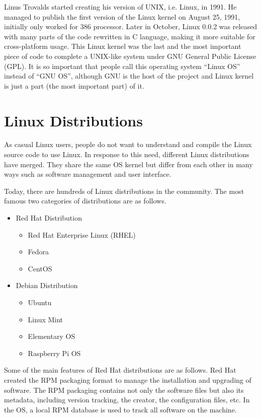 Linus Trovalds started creating his version of UNIX, i.e. Linux, in 1991. He managed to publish the first version of the Linux kernel on August 25, 1991, initially only worked for 386 processor. Later in October, Linux 0.0.2 was released with many parts of the code rewritten in C language, making it more suitable for cross-platform usage. This Linux kernel was the last and the most important piece of code to complete a UNIX-like system under GNU General Public License (GPL). It is so important that people call this operating system ``Linux OS'' instead of ``GNU OS'', although GNU is the host of the project and Linux kernel is just a part (the most important part) of it.

\section{Linux Distributions}

As casual Linux users, people do not want to understand and compile the Linux source code to use Linux. In response to this need, different Linux distributions have merged. They share the same OS kernel but differ from each other in many ways such as software management and user interface.

Today, there are hundreds of Linux distributions in the community. The most famous two categories of distributions are as follows.
\begin{itemize}
  \item Red Hat Distribution
  \begin{itemize}
    \item Red Hat Enterprise Linux (RHEL)
    \item Fedora
    \item CentOS
  \end{itemize}
  \item Debian Distribution
  \begin{itemize}
    \item Ubuntu
    \item Linux Mint
    \item Elementary OS
    \item Raspberry Pi OS
  \end{itemize}
\end{itemize}

Some of the main features of Red Hat distributions are as follows. Red Hat created the RPM packaging format to manage the installation and upgrading of software. The RPM packaging contains not only the software files but also its metadata, including version tracking, the creator, the configuration files, etc. In the OS, a local RPM database is used to track all software on the machine.


